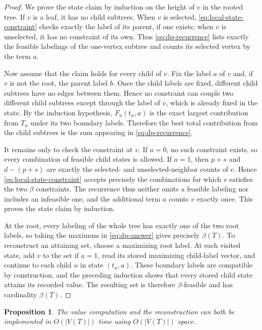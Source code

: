 \documentclass[11pt,a4paper]{article}
\newtheorem{proposition}[theorem]{Proposition}
\numberwithin{equation}{section}
\begin{document}
\begin{proof}
We prove the state claim by induction on the height of
\(v\) in the rooted tree. If \(v\) is a leaf, it has no child subtrees.
When \(v\) is selected, \eqref{eq:local-state-constraint} checks exactly the label of its parent, if
one exists; when \(v\) is unselected, it has no constraint of its own.
Thus \eqref{eq:dp-recurrence} lists exactly the feasible labelings of the one-vertex
subtree and counts its selected vertex by the term \(a\).

Now assume that the claim holds for every child of \(v\). Fix the label
\(a\) of \(v\) and, if \(v\) is not the root, the parent label \(b\).
Once the child labels are fixed, different child subtrees have no edges
between them. Hence no constraint can couple two different child
subtrees except through the label of \(v\), which is already fixed in
the state. By the induction hypothesis, \(F_u(t_u,a)\) is the exact
largest contribution from \(T_u\) under its two boundary labels.
Therefore the best total contribution from the child subtrees is the sum
appearing in \eqref{eq:dp-recurrence}.

It remains only to check the constraint at \(v\). If \(a=0\), no such
constraint exists, so every combination of feasible child states is
allowed. If \(a=1\), then \(p+s\) and \(d-(p+s)\) are exactly the
selected- and unselected-neighbor counts of \(v\). Hence \eqref{eq:local-state-constraint} accepts
precisely the combinations for which \(v\) satisfies the two \(\beta\)
constraints. The recurrence thus neither omits a feasible labeling nor
includes an infeasible one, and the additional term \(a\) counts \(v\)
exactly once. This proves the state claim by induction.

At the root, every labeling of the whole tree has exactly one of the two
root labels, so taking the maximum in \eqref{eq:dp-answer} gives precisely
\(\beta(T)\). To reconstruct an attaining set, choose a maximizing root
label. At each visited state, add \(v\) to the set if \(a=1\), read its
stored maximizing child-label vector, and continue to each child \(u\)
in state \((t_u,a)\). These boundary labels are compatible by
construction, and the preceding induction shows that every stored child
state attains its recorded value. The resulting set is therefore
\(\beta\)-feasible and has cardinality \(\beta(T)\).
\end{proof}

\begin{proposition}\label{prop:dp-complexity}
The value computation and the reconstruction
can both be implemented in \(O(|V(T)|)\) time using \(O(|V(T)|)\) space.
\end{proposition}
\end{document}
